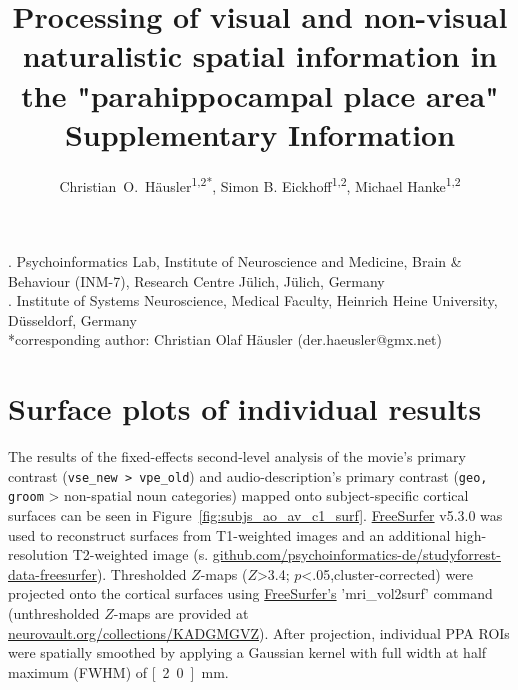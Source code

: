 \documentclass[english,11pt]{article}
\begin{document}




\title{%
  Processing of visual and non-visual naturalistic spatial information in
the "parahippocampal place area" \\
[1ex] \large Supplementary Information}

\author{
    Christian~O.~Häusler\textsuperscript{1,2{*}},
    Simon B. Eickhoff\textsuperscript{1,2},
    Michael Hanke\textsuperscript{1,2}}

\maketitle
\thispagestyle{fancy}

. Psychoinformatics Lab, Institute of Neuroscience and Medicine, Brain \&
Behaviour (INM-7), Research Centre Jülich, Jülich, Germany\\
. Institute of Systems Neuroscience, Medical Faculty, Heinrich Heine University,
Düsseldorf, Germany\\
{*}corresponding author: Christian Olaf Häusler (der.haeusler@gmx.net)

\tableofcontents

\listoffigures

\pagebreak[4]

\section{Surface plots of individual results}

The results of the fixed-effects second-level analysis of the movie's primary
contrast (\texttt{vse\_new > vpe\_old}) and audio-description's primary contrast
(\texttt{geo, groom} > non-spatial noun categories) mapped onto subject-specific
cortical surfaces can be seen in Figure~\ref{fig:subjs_ao_av_c1_surf}.
\href{https://surfer.nmr.mgh.harvard.edu}{FreeSurfer} v5.3.0
\citep{dale1999cortical} was used to reconstruct surfaces from T1-weighted
images and an additional high-resolution T2-weighted image
(s. \href{https://github.com/psychoinformatics-de/studyforrest-data-freesurfer}{\url{github.com/psychoinformatics-de/studyforrest-data-freesurfer}}).
Thresholded $Z$-maps ($Z$>3.4; $p$<.05,\linebreak cluster-corrected) were projected onto
the cortical surfaces using
\href{https://surfer.nmr.mgh.harvard.edu}{FreeSurfer's} \citep{dale1999cortical}
'mri\_vol2surf' command (unthresholded $Z$-maps are provided at
\href{https://neurovault.org/collections/KADGMGVZ}{\url{neurovault.org/collections/KADGMGVZ}}).
After projection, individual PPA ROIs were spatially smoothed by applying a
Gaussian kernel with full width at half maximum (FWHM) of \unit[2.0]{mm}.
\end{document}
